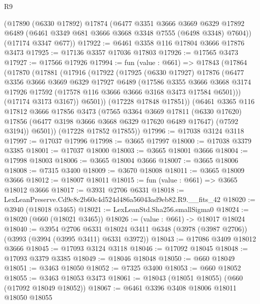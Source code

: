 \begin{lexlean}{R9}
\begin{coremodule}
    (@17890
      (@6330 @17892)
      @17874
      (@6477
        @3351
        @3666
        @3669
        @6329
        @17892
        @6489
        (@6461 @3349 @681 @3666 @3668 @3348 @7555 (@6498 @3348) @7604))
      (@17174 @3347 @677))
@17922 := @6461 @3358 @116 @17804 @3666 @17876 @3473
@17925 := @17136 @3357 @17036 @17803
@17926 := @17565 @3473
@17927 := @17566 @17926
@17994 := fun (value : @661) =>
  @17843
    (@17864
      (@17870
        (@17881
          (@17916
            (@17922
              (@17925
                (@6330 @17927)
                @17876
                (@6477
                  @3356
                  @3666
                  @3669
                  @6329
                  @17927
                  @6489
                  (@17586
                    @3355
                    @3666
                    @3668
                    @3174
                    @17926
                    @17592
                    (@17578 @116 @3666 @3666 @3168 @3473 @17584 @6501)))
                (@17174 @3173 @3167))
              @6501))
          (@17228 @17848 @17851))
        (@6461
          @3365
          @116
          @17812
          @3666
          @17856
          @3473
          (@7565
            @3364
            @3669
            @17811
            (@6330 @17620)
            @17856
            (@6477 @3198 @3666 @3668 @6329 @17620 @6489 @17647)
            (@7592 @3194))
          @6501))
      (@17228 @17852 @17855))
@17996 := @17038 @3124 @3118
@17997 := @17037 @17996
@17998 := @3665 @17997
@18000 := @17038 @3379 @3385
@18001 := @17037 @18000
@18003 := @3665 @18001 @3666
@18004 := @17998 @18003
@18006 := @3665 @18004 @3666
@18007 := @3665 @18006
@18008 := @7315 @3400
@18009 := @3670 @18008
@18011 := @3665 @18009 @3666
@18012 := @18007 @18011
@18015 := fun (value : @661) => @3665 @18012 @3666
@18017 := @3931 @2706 @6331
@18018 := LexLeanPreserve.Cd9c8c2b60c4d524d486a56043ad9eb82.R9.__fits_42
@18020 := @3940 (@18018 @3465)
@18021 := LexLeanStd.Sha256.smallSigma0
@18024 := @18020 (@660 (@18021 @3465))
@18026 := (value : @661) -> @18017 @18024
@18040 := @3954
    @2706
    @6331
    @18024
    @3411
    @6348
    (@3978 (@3987 @2706))
    (@3993 (@3994 (@3995 @3411) @6331 @3972))
@18043 := @17086 @3409 @18012 @3666
@18045 := @17093 @3124 @3118
@18046 := @17092 @18045
@18048 := @17093 @3379 @3385
@18049 := @18046 @18048
@18050 := @660 @18049
@18051 := @3463 @18050
@18052 := @7325 @3400
@18053 := @660 @18052
@18055 := @3463 @18053 @3473
@18061 := @18043 (@18051 @18055) (@660 (@17092 @18049 @18052))
@18067 := @6461 @3396 @3408 @18006 @18011 @18050 @18055

\end{coremodule}
\end{lexlean}
